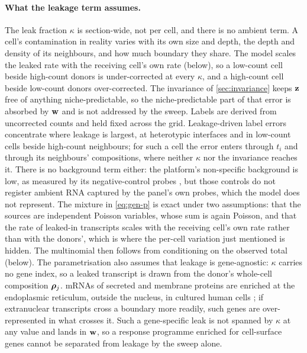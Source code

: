 \paragraph{What the leakage term assumes.}
 The leak fraction $\kappa$ is section-wide, not per cell, and there is no ambient term. A cell's contamination in reality varies with its own size and depth, the depth and density of its neighbours, and how much boundary they share. The model scales the leaked rate with the receiving cell's own rate (below), so a low-count cell beside high-count donors is under-corrected at every $\kappa$, and a high-count cell beside low-count donors over-corrected. The invariance of \cref{sec:invariance} keeps $\mathbf{z}$ free of anything niche-predictable, so the niche-predictable part of that error is absorbed by $\mathbf{w}$ and is not addressed by the sweep. Labels are derived from uncorrected counts and held fixed across the grid. Leakage-driven label errors concentrate where leakage is largest, at heterotypic interfaces and in low-count cells beside high-count neighbours; for such a cell the error enters through $t_i$ and through its neighbours' compositions, where neither $\kappa$ nor the invariance reaches it. There is no background term either: the platform's non-specific background is low, as measured by its negative-control probes \citep{janesick2023}, but those controls do not register ambient RNA captured by the panel's own probes, which the model does not represent. The mixture in \cref{eq:gen-p} is exact under two assumptions: that the sources are independent Poisson variables, whose sum is again Poisson, and that the rate of leaked-in transcripts scales with the receiving cell's own rate rather than with the donors', which is where the per-cell variation just mentioned is hidden. The multinomial then follows from conditioning on the observed total (below). The parametrisation also assumes that leakage is gene-agnostic: $\kappa$ carries no gene index, so a leaked transcript is drawn from the donor's whole-cell composition $\boldsymbol{\rho}_j$. mRNAs of secreted and membrane proteins are enriched at the endoplasmic reticulum, outside the nucleus, in cultured human cells \citep{xia2019merfish}; if extranuclear transcripts cross a boundary more readily, such genes are over-represented in what crosses it. Such a gene-specific leak is not spanned by $\kappa$ at any value and lands in $\mathbf{w}$, so a response programme enriched for cell-surface genes cannot be separated from leakage by the sweep alone.

